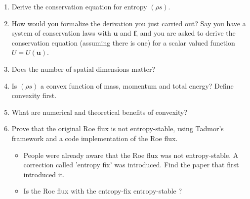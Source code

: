 \documentclass{article}
\begin{document}
\begin{enumerate}
    \item Derive the conservation equation for entropy $(\rho s)$. 
    \item How would you formalize the derivation you just carried out? Say you have a system of conservation laws with $\mathbf{u}$ and $\mathbf{f}$, and you are asked to derive the conservation equation (assuming there is one) for a scalar valued function $U = U(\mathbf{u})$.
    \item Does the number of spatial dimensions matter?
    \item Is $(\rho s)$ a convex function of mass, momentum and total energy? Define convexity first.
    \item What are numerical and theoretical benefits of convexity?
    \item Prove that the original Roe flux is not entropy-stable, using Tadmor's framework \cite{Tadmor1987} and a code implementation of the Roe flux.  
    \begin{itemize}
        \item People were already aware that the Roe flux was not entropy-stable. A correction called 'entropy fix' was introduced. Find the paper that first introduced it. 
        \item Is the Roe flux with the entropy-fix entropy-stable ?  
    \end{itemize}
\end{enumerate}

\begin{thebibliography}{9}

\end{thebibliography}
\end{document}
